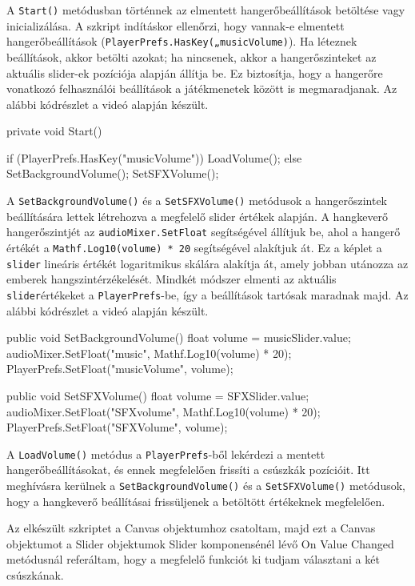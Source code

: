 A \texttt{Start()} metódusban történnek az elmentett hangerőbeállítások betöltése vagy inicializálása. A szkript indításkor ellenőrzi, hogy vannak-e elmentett hangerőbeállítások (\texttt{PlayerPrefs.HasKey(„musicVolume)}). Ha léteznek beállítások, akkor betölti azokat; ha nincsenek, akkor a hangerőszinteket az aktuális slider-ek pozíciója alapján állítja be. Ez biztosítja, hogy a hangerőre vonatkozó felhasználói beállítások a játékmenetek között is megmaradjanak. Az alábbi kódrészlet a \cite{volumesettings} videó alapján készült.

\begin{java}
private void Start()
{
    if (PlayerPrefs.HasKey("musicVolume"))
    {
        LoadVolume();
    }
    else 
    {
        SetBackgroundVolume();
        SetSFXVolume();
    }
    
}
\end{java}

A \texttt{SetBackgroundVolume()} és a \texttt{SetSFXVolume()} metódusok a hangerőszintek beállítására lettek létrehozva a megfelelő slider értékek alapján. A hangkeverő hangerőszintjét az \texttt{audioMixer.SetFloat} segítségével állítjuk be, ahol a hangerő értékét a \texttt{Mathf.Log10(volume) * 20} segítségével alakítjuk át. Ez a képlet a \texttt{slider} lineáris értékét logaritmikus skálára alakítja át, amely jobban utánozza az emberek hangszintérzékelését. Mindkét módszer elmenti az aktuális \texttt{slider}értékeket a \texttt{PlayerPrefs}-be, így a beállítások tartósak maradnak majd. Az alábbi kódrészlet a \cite{volumesettings} videó alapján készült.

\begin{java}
public void SetBackgroundVolume()
{
    float volume = musicSlider.value;
    audioMixer.SetFloat("music",
        Mathf.Log10(volume) * 20);
    PlayerPrefs.SetFloat("musicVolume", volume);
}

public void SetSFXVolume()
{
    float volume = SFXSlider.value;
    audioMixer.SetFloat("SFXvolume", 
        Mathf.Log10(volume) * 20);
    PlayerPrefs.SetFloat("SFXVolume", volume);
}
\end{java}

A \texttt{LoadVolume()} metódus a \texttt{PlayerPrefs}-ből lekérdezi a mentett hangerőbeállításokat, és ennek megfelelően frissíti a csúszkák pozícióit. Itt meghívásra kerülnek a \texttt{SetBackgroundVolume()} és a \texttt{SetSFXVolume()} metódusok, hogy a hangkeverő beállításai frissüljenek a betöltött értékeknek megfelelően.

Az elkészült szkriptet a Canvas objektumhoz csatoltam, majd ezt a Canvas objektumot a Slider objektumok Slider komponensénél lévő On Value Changed metódusnál referáltam, hogy a megfelelő funkciót ki tudjam választani a két csúszkának.

